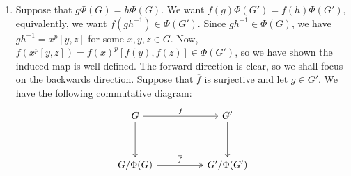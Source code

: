 \documentclass[12pt]{article}
\theoremstyle{definitionstyle}
\begin{document}
\begin{enumerate}[leftmargin=\labelsep]
		\item Suppose that $g\Phi(G) = h\Phi(G)$. We want $f(g)\Phi(G') = f(h)\Phi(G')$, equivalently, we want $f(gh^{-1}) \in \Phi(G')$. Since $gh^{-1} \in \Phi(G)$, we have $gh^{-1} = x^p[y, z]$ for some $x, y, z \in G$. Now, $f(x^p[y, z]) = f(x)^p[f(y), f(z)] \in \Phi(G')$, so we have shown the induced map is well-defined. The forward direction is clear, so we shall focus on the backwards direction. Suppose that $\overline f$ is surjective and let $g \in G'$. We have the following commutative diagram:
		\[\begin{tikzcd}
			G && {G'} \\
			\\
			{G/\Phi(G)} && {G'/\Phi(G')}
			\arrow[from=1-1, to=3-1]
			\arrow["\overline{f}", two heads, from=3-1, to=3-3]
			\arrow["f", from=1-1, to=1-3]
			\arrow[from=1-3, to=3-3]
		\end{tikzcd}\]
		

\end{enumerate}
\end{document}
